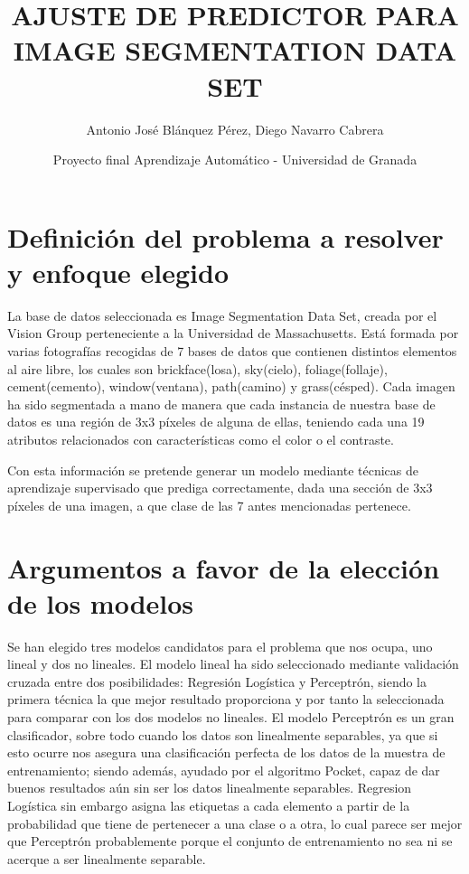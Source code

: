 \documentclass{article}
\title{AJUSTE DE PREDICTOR PARA IMAGE SEGMENTATION DATA SET}
\author{Antonio José Blánquez Pérez, Diego Navarro Cabrera}
\date{Proyecto final Aprendizaje Automático - Universidad de Granada}
\begin{document}
 \setlength{\parskip}{1em} 

	\maketitle
	

	\section{Definición del problema a resolver y enfoque elegido}

	La base de datos seleccionada es Image Segmentation Data Set, creada por el Vision Group perteneciente a la Universidad de Massachusetts. Está formada por varias fotografías recogidas de 7 bases de datos que contienen distintos elementos al aire libre, los cuales son brickface(losa), sky(cielo), foliage(follaje), cement(cemento), window(ventana), path(camino) y grass(césped). Cada imagen ha sido segmentada a mano de manera que cada instancia de nuestra base de datos es una región de 3x3 píxeles de alguna de ellas, teniendo cada una 19 atributos relacionados con características como el color o el contraste. 
	\par
	Con esta información se pretende generar un modelo mediante técnicas de aprendizaje supervisado que prediga correctamente, dada una sección de 3x3 píxeles de una imagen, a que clase de las 7 antes mencionadas pertenece.
	
	\section{Argumentos a favor de la elección de los modelos}
	
	Se han elegido tres modelos candidatos para el problema que nos ocupa, uno lineal y dos no lineales. El modelo lineal ha sido seleccionado mediante validación cruzada entre dos posibilidades: Regresión Logística y Perceptrón, siendo la primera técnica la que mejor resultado proporciona y por tanto la seleccionada para comparar con los dos modelos no lineales. El modelo Perceptrón es un gran clasificador, sobre todo cuando los datos son linealmente separables, ya que si esto ocurre nos asegura una clasificación perfecta de los datos de la muestra de entrenamiento; siendo además, ayudado por el algoritmo Pocket, capaz de dar buenos resultados aún sin ser los datos linealmente separables. Regresion Logística sin embargo asigna las etiquetas a cada elemento a partir de la probabilidad que tiene de pertenecer a una clase o a otra, lo cual parece ser mejor que Perceptrón probablemente porque el conjunto de entrenamiento no sea ni se acerque a ser linealmente separable.
		
\end{document}
